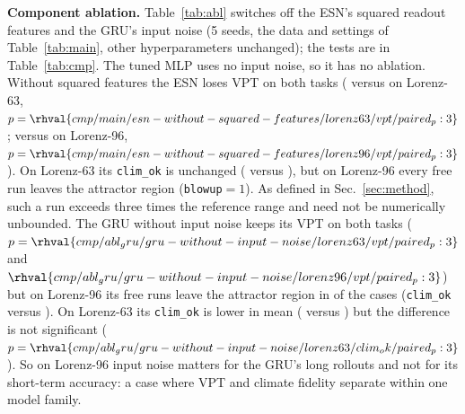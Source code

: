 \textbf{Component ablation.} Table~\ref{tab:abl} switches off the ESN's squared readout features and the GRU's input noise (5 seeds, the data and settings of Table~\ref{tab:main}, other hyperparameters unchanged); the tests are in Table~\ref{tab:cmp}. The tuned MLP uses no input noise, so it has no ablation. Without squared features the ESN loses VPT on both tasks ( versus  on Lorenz-63, $p=\rhval{cmp/main/esn-without-squared-features/lorenz63/vpt/paired_p:3}$;  versus  on Lorenz-96, $p=\rhval{cmp/main/esn-without-squared-features/lorenz96/vpt/paired_p:3}$). On Lorenz-63 its \texttt{clim\_ok} is unchanged ( versus ), but on Lorenz-96 every free run leaves the attractor region (\texttt{blowup}$=1$). As defined in Sec.~\ref{sec:method}, such a run exceeds three times the reference range and need not be numerically unbounded. The GRU without input noise keeps its VPT on both tasks ($p=\rhval{cmp/abl_gru/gru-without-input-noise/lorenz63/vpt/paired_p:3}$ and $\rhval{cmp/abl_gru/gru-without-input-noise/lorenz96/vpt/paired_p:3}$) but on Lorenz-96 its free runs leave the attractor region in  of the cases (\texttt{clim\_ok}  versus ). On Lorenz-63 its \texttt{clim\_ok} is lower in mean ( versus ) but the difference is not significant ($p=\rhval{cmp/abl_gru/gru-without-input-noise/lorenz63/clim_ok/paired_p:3}$). So on Lorenz-96 input noise matters for the GRU's long rollouts and not for its short-term accuracy: a case where VPT and climate fidelity separate within one model family.

\begin{table}[t]\centering\caption{Component ablation (5 seeds). \texttt{blowup}: fraction of the 20 free runs per seed that leave the attractor region.}\label{tab:abl}
\small\setlength{\tabcolsep}{4pt}\end{table}

